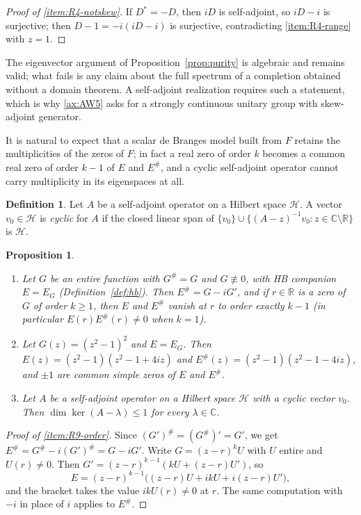 \documentclass[11pt]{amsart}
\theoremstyle{plain}
\newtheorem{proposition}[theorem]{Proposition}
\theoremstyle{definition}
\newtheorem{definition}[theorem]{Definition}
\theoremstyle{remark}
\numberwithin{equation}{section}
\newcommand{\C}{\mathbb{C}}
\newcommand{\R}{\mathbb{R}}
\newcommand{\cH}{\mathscr{H}}
\begin{document}
\begin{proof}[Proof of \ref{item:R4-notskew}]
If $D^*=-D$, then $iD$ is self-adjoint, so $iD-i$ is surjective; then
$D-1=-i(iD-i)$ is surjective, contradicting \ref{item:R4-range} with
$z=1$.
\end{proof}

The eigenvector argument of Proposition~\ref{prop:purity} is algebraic
and remains valid; what fails is any claim about the full spectrum of a
completion obtained without a domain theorem. A self-adjoint
realization requires such a statement, which is why \ref{ax:AW5} asks
for a strongly continuous unitary group with skew-adjoint generator.

It is natural to expect that a scalar de Branges model built from $F$
retains the multiplicities of the zeros of $F$; in fact a real zero of
order $k$ becomes a common real zero of order $k-1$ of $E$ and $E^\#$,
and a cyclic self-adjoint operator cannot carry multiplicity in its
eigenspaces at all.

\begin{definition}\label{def:cyclic}
Let $A$ be a self-adjoint operator on a Hilbert space $\cH$. A vector
$v_0\in\cH$ is \emph{cyclic} for $A$ if the closed linear span of
$\{v_0\}\cup\{(A-z)^{-1}v_0:z\in\C\setminus\R\}$ is $\cH$.
\end{definition}

\begin{proposition}\label{prop:R9}
\leavevmode
\begin{enumerate}[label=(\roman*)]
\item\label{item:R9-order} Let $G$ be an entire function with $G^\#=G$
  and $G\not\equiv0$, with HB companion $E=E_G$
  (Definition~\ref{def:hb}). Then $E^\#=G-iG'$, and if $r\in\R$ is a
  zero of $G$ of order $k\ge1$, then $E$ and $E^\#$ vanish at $r$ to
  order exactly $k-1$ (in particular $E(r)E^\#(r)\ne0$ when $k=1$).
\item\label{item:R9-example} Let $G(z)=(z^2-1)^2$ and $E=E_G$. Then
  $E(z)=(z^2-1)(z^2-1+4iz)$ and $E^\#(z)=(z^2-1)(z^2-1-4iz)$, and $\pm1$
  are common simple zeros of $E$ and $E^\#$.
\item\label{item:R9-cyclic} Let $A$ be a self-adjoint operator on a
  Hilbert space $\cH$ with a cyclic vector $v_0$. Then
  $\dim\ker(A-\lambda)\le1$ for every $\lambda\in\C$.
\end{enumerate}
\end{proposition}

\begin{proof}[Proof of \ref{item:R9-order}]
Since $(G')^\#=(G^\#)'=G'$, we get $E^\#=G^\#-i(G')^\#=G-iG'$. Write
$G=(z-r)^kU$ with $U$ entire and $U(r)\ne0$. Then
$G'=(z-r)^{k-1}(kU+(z-r)U')$, so
\[
E=(z-r)^{k-1}\bigl((z-r)U+ikU+i(z-r)U'\bigr),
\]
and the bracket takes the value $ikU(r)\ne0$ at $r$. The same computation
with $-i$ in place of $i$ applies to $E^\#$.
\end{proof}
\end{document}
